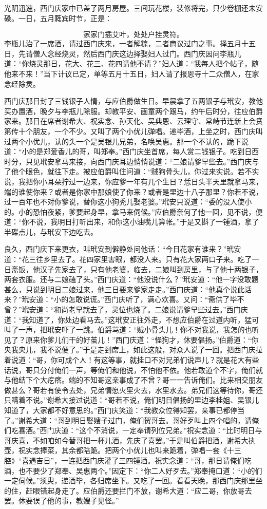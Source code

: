 光阴迅速，西门庆家中已盖了两月房屋。三间玩花楼，装修将完，只少卷棚还未安磉。一日，五月蕤宾时节，正是：

\[
家家门插艾叶，处处户挂灵符。
\]
李瓶儿治了一席酒，请过西门庆来，一者解粽，二者商议过门之事。择五月十五日，先请僧人念经烧灵，然后西门庆这边择娶妇人过门。西门庆因问李瓶儿道：“你烧灵那日，花大、花三、花四请他不请？”妇人道：“我每人把个帖子，随他来不来！”当下计议已定，单等五月十五日，妇人请了报恩寺十二众僧人，在家念经除灵。

西门庆那日封了三钱银子人情，与应伯爵做生日。早晨拿了五两银子与玳安，教他买办置酒，晚夕与李瓶儿除服。却教平安、画童两个跟马，约午后时分，往应伯爵家来。那日在席者谢希大、祝实念、孙天化、吴典恩、云理守、常峙节连新上会贲第传十个朋友，一个不少。又叫了两个小优儿弹唱。递毕酒，上坐之时，西门庆叫过两个小优儿，认的头一个是吴银儿兄弟，名唤吴惠。那一个不认的，跪下说道：“小的是郑爱香儿的哥，叫郑奉。”西门庆坐首席，每人赏二钱银子。吃到日西时分，只见玳安拿马来接，向西门庆耳边悄悄说道：“二娘请爹早些去。”西门庆与了他个眼色，就往下走。被应伯爵叫住问道：“贼狗骨头儿，你过来实说。若不实说，我把你小耳朵拧过一边来，你应爹一年有几个生日？恁日头半天里就拿马来，端的谁使你来？或者是你家中那娘使了你来？或者是里边十八子那里？你若不说，过一百年也不对你爹说，替你这小狗秃儿娶老婆。”玳安只说道：“委的没人使小的。小的恐怕夜紧，爹要起身早，拿马来伺候。”应伯爵奈何了他一回，见不说，便道：“你不说，我明日打听出来，和你这小油嘴儿算帐。”于是又斟了一锺酒，拿了半碟点儿，与玳安下边吃去。

良久，西门庆下来更衣，叫玳安到僻静处问他话：“今日花家有谁来？”玳安道：“花三往乡里去了。花四家里害眼，都没人来。只有花大家两口子来。吃了一日斋饭，他汉子先家去了，只有他老婆，临去，二娘叫到房里，与了他十两银子，两套衣服。还与二娘磕了头。”西门庆道：“他没说什么？”玳安道：“他一字没敢题甚么，只说到明日二娘过来，他三日要来爹家走走。”西门庆道：“他真个说此话来？”玳安道：“小的怎敢说谎。”西门庆听了，满心欢喜。又问：“斋供了毕不曾？”玳安道：“和尚老早就去了，灵位也烧了。二娘说请爹早些过去。”西门庆道：“我知道了，你处边看马去。”这玳安正往外走，不想应伯爵在过道内听，猛可叫了一声，把玳安吓了一跳。伯爵骂道：“贼小骨头儿！你不对我说，我怎的也听见了？原来你爹儿们干的好茧儿！”西门庆道：“怪狗才，休要倡扬。”伯爵道：“你央我央儿，我不说便了。”于是走到席上，如此这般，对众人说了一回。把西门庆拉着说道：“哥，你可成个人！有这等事，就挂口不对兄弟们说声儿？就是花大有些话说，哥只分付俺们一声，等俺们和他说，不怕他不依。他若敢道个不字，俺们就与他结下个大疙瘩。端的不知哥这亲事成了不曾？哥一一告诉俺们。比来相交朋友做甚么？哥若有使令去处，兄弟情愿火里火去，水里水去。弟兄们这等待你，哥还只瞒着不说。”谢希大接过说道：“哥若不说，俺们明日倡扬的里边李桂姐、吴银儿知道了，大家都不好意思的。”西门庆笑道：“我教众位得知罢，亲事已都停当了。”谢希大道：“哥到明日娶嫂子过门，俺们贺哥去。哥好歹叫上四个唱的，请俺们吃喜酒。”西门庆道：“这个不消说，一定奉请列位兄弟。”祝实念道：“比时明日与哥庆喜，不如咱如今替哥把一杯儿酒，先庆了喜罢。”于是叫伯爵把酒，谢希大执壶，祝实念捧菜，其余都陪跪。把两个小优儿也叫来跪着，弹唱一套《十三腔》“喜遇吉日”，一连把西门庆灌了三四锺酒。祝实念道：“哥，那日请俺们吃酒，也不要少了郑奉、吴惠两个。”因定下：“你二人好歹去。”郑奉掩口道：“小的们一定伺候。”须臾，递酒毕，各归席坐下。又吃了一回。看看天晚，那西门庆那里坐的住，赶眼错起身走了。应伯爵还要拦门不放，谢希大道：“应二哥，你放哥去罢。休要误了他的事，教嫂子见怪。”

